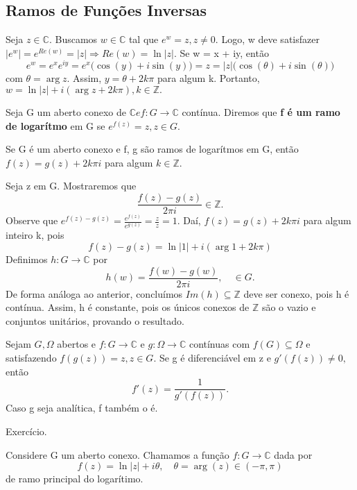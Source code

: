 \documentclass[complex.tex]{subfiles}
\begin{document}
\subsection{Ramos de Funções Inversas}
Seja $z\in \mathbb{C}.$ Buscamos $w\in \mathbb{C}$ tal que $e^{w} = z, z\neq0.$ Logo, w deve satisfazer $|e^{w}|
	= e^{Re(w)} = |z|\Rightarrow Re(w) = \ln{|z|}.$ Se w = x + iy, então
$$
	e^{w} = e^{x}e^{iy} = e^{x}\biggl(\cos{(y)} + i\sin{(y)}\biggr) = z = |z|\biggl(\cos{(\theta)} + i\sin{(\theta)}\biggr)
$$
com $\theta = \arg{z}.$ Assim, $y = \theta + 2k\pi$ para algum k. Portanto, $w = \ln{|z|} + i(\arg{z} + 2k\pi), k\in \mathbb{Z}.$
\begin{def*}
	Seja G um aberto conexo de $\mathbb{C} e f:G\rightarrow \mathbb{C}$ contínua. Diremos que \textbf{f é um ramo de logarítmo}
	em G se $e^{f(z)} = z, z\in{G}.$
\end{def*}
\begin{prop*}
	Se G é um aberto conexo e f, g são ramos de logarítmos em G, então $f(z) = g(z) + 2k\pi i$ para algum
	$k\in \mathbb{Z}$.
\end{prop*}
\begin{proof*}
	Seja z em G. Mostraremos que
	$$
		\frac{f(z) - g(z)}{2\pi i}\in \mathbb{Z}.
	$$
	Observe que $e^{f(z) - g(z)} = \frac{e^{f(z)}}{e^{g(z)}} = \frac{z}{z} = 1.$ Daí, $f(z) = g(z) + 2k\pi i$ para algum
	inteiro k, pois
	$$
		f(z) - g(z) = \ln{|1|} + i(\arg{1} + 2k\pi)
	$$
	Definimos $h:G\rightarrow \mathbb{C}$ por
	$$
		h(w) = \frac{f(w) - g(w)}{2 \pi i}, \quad \in{G}.
	$$
	De forma análoga ao anterior, concluímos $Im(h)\subseteq{\mathbb{Z}}$ deve ser conexo, pois h é contínua. Assim,
	h é constante, pois os únicos conexos de $\mathbb{Z}$ são o vazio e conjuntos unitários, provando o resultado. \qedsymbol
\end{proof*}
\begin{prop*}
	Sejam $G, \Omega$ abertos e $f:G\rightarrow \mathbb{C}\text{ e }g:\Omega\rightarrow \mathbb{C}$ contínuas com $f(G)\subseteq{\Omega}$
	e satisfazendo $f(g(z)) = z, z\in{G}.$ Se g é diferenciável em z e $g'(f(z))\neq0,$ então
	$$
		f'(z) = \frac{1}{g'(f(z))}.
	$$
	Caso g seja analítica, f também o é.
\end{prop*}
\begin{proof*}
	Exercício.
\end{proof*}
Considere G um aberto conexo. Chamamos a função $f:G\rightarrow \mathbb{C} $ dada por
$$
	f(z) = \ln{|z|} + i \theta, \quad \theta=\arg{(z)}\in{(-\pi, \pi)}
$$
de ramo principal do logarítimo.
\end{document}
